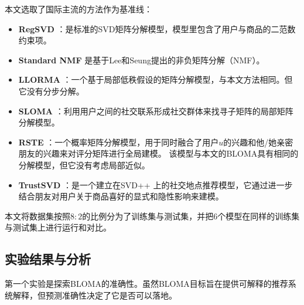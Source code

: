 本文选取了国际主流的方法作为基准线：
\begin{itemize}
\item \textbf{RegSVD} ：是标准的SVD矩阵分解模型，模型里包含了用户与商品的二范数约束项。
\item \textbf{Standard NMF} 是基于Lee和Seung提出的非负矩阵分解（NMF）。
\item \textbf{LLORMA} ：一个基于局部低秩假设的矩阵分解模型，与本文方法相同。但它没有分步分解。

\item \textbf{SLOMA} ：利用用户之间的社交联系形成社交群体来找寻子矩阵的局部矩阵分解模型。

\item \textbf{RSTE} ：一个概率矩阵分解模型，用于同时融合了用户$u$的兴趣和他/她亲密朋友的兴趣来对评分矩阵进行全局建模。 该模型与本文的BLOMA具有相同的分解模型，但它没有考虑局部近似。
\item \textbf{TrustSVD} ：是一个建立在SVD++ 上的社交地点推荐模型，它通过进一步结合朋友对用户关于商品喜好的显式和隐性影响来建模。
\end{itemize}
本文将数据集按照$8:2$的比例分为了训练集与测试集，并把6个模型在同样的训练集与测试集上进行运行和对比。

\subsection{实验结果与分析}
第一个实验是探索BLOMA的准确性。虽然BLOMA目标旨在提供可解释的推荐系统解释，但预测准确性决定了它是否可以落地。

